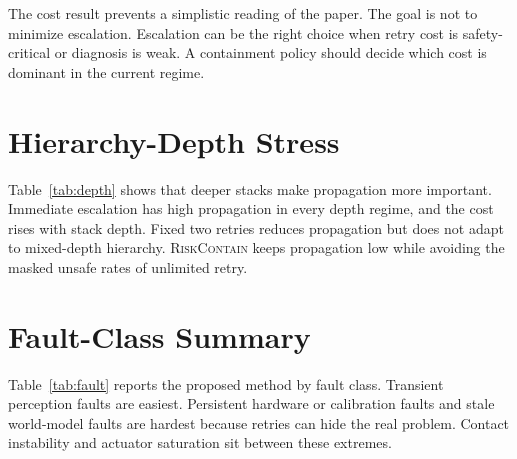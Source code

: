 \documentclass{article}
\newcommand{\method}{\textsc{RiskContain}\xspace}
\begin{document}
\begin{table}[t]
\centering
\caption{Cost-regime stress. Risk-calibrated containment adjusts retry effort under retry, escalation, and safety-critical costs.}
\label{tab:cost}
\resizebox{\linewidth}{!}{}
\end{table}

The cost result prevents a simplistic reading of the paper. The goal is not to minimize escalation. Escalation can be the right choice when retry cost is safety-critical or diagnosis is weak. A containment policy should decide which cost is dominant in the current regime.

\section{Hierarchy-Depth Stress}

Table~\ref{tab:depth} shows that deeper stacks make propagation more important. Immediate escalation has high propagation in every depth regime, and the cost rises with stack depth. Fixed two retries reduces propagation but does not adapt to mixed-depth hierarchy. \method keeps propagation low while avoiding the masked unsafe rates of unlimited retry.

\begin{table}[t]
\centering
\caption{Hierarchy-depth stress. Deeper stacks magnify upward propagation costs and make containment policy more important.}
\label{tab:depth}
\resizebox{\linewidth}{!}{}
\end{table}

\section{Fault-Class Summary}

Table~\ref{tab:fault} reports the proposed method by fault class. Transient perception faults are easiest. Persistent hardware or calibration faults and stale world-model faults are hardest because retries can hide the real problem. Contact instability and actuator saturation sit between these extremes.

\begin{table}[t]
\centering
\caption{Fault-class summary for \method. Persistent and stale-state faults are hardest because over-retry can mask unsafe state.}
\label{tab:fault}
\resizebox{\linewidth}{!}{}
\end{table}
\end{document}
